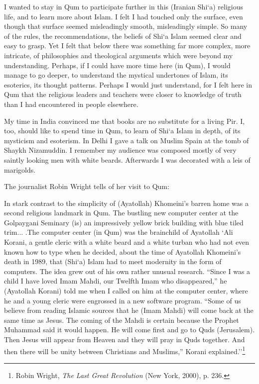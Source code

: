\begin{quotex}
I wanted to stay in Qum to participate further in this (Iranian Shi`a) religious life, and to learn more about Islam. I felt I had touched only the surface, even though that surface seemed misleadingly smooth, misleadingly simple. So many of the rules, the recommendations, the beliefs of Shi`a Islam seemed clear and easy to grasp. Yet I felt that below there was something far more complex, more intricate, of philosophies and theological arguments which were beyond my understanding. Perhaps, if I could have more time here (in Qum), I would manage to go deeper, to understand the mystical undertones of Islam, its esoterics, its thought patterns. Perhaps I would just understand, for I felt here in Qum that the religious leaders and teachers were closer to knowledge of truth than I had encountered in people elsewhere.
\end{quotex}


My time in India convinced me that books are no substitute for a living Pir. I, too, should like to spend time in Qum, to learn of Shi`a Islam in depth, of its mysticism and esoterism. In Delhi I gave a talk on Muslim Spain at the tomb of Shaykh Nizamuddin. I remember my audience was composed mostly of very saintly looking men with white beards. Afterwards I was decorated with a leis of marigolds.

The journalist Robin Wright tells of her visit to Qum:

In stark contrast to the simplicity of (Ayatollah) Khomeini's barren home was a second religious landmark in Qum. The bustling new computer center at the Golpaygani Seminary (is) an impressively yellow brick building with blue tiled trim... .The computer center (in Qum) was the brainchild of Ayatollah `Ali Korani, a gentle cleric with a white beard and a white turban who had not even known how to type when he decided, about the time of Ayatollah Khomeini's death in 1989, that (Shi`a) Islam had to meet modernity in the form of computers. The idea grew out of his own rather unusual research. ``Since I was a child I have loved Imam Mahdi, our Twelfth Imam who disappeared,'' he (Ayatollah Korani) told me when I called on him at the computer center, where he and a young cleric were engrossed in a new software program. ``Some of us believe from reading Islamic sources that he (Imam Mahdi) will come back at the same time as Jesus. The coming of the Mahdi is certain because the Prophet Muhammad said it would happen. He will come first and go to Quds (Jerusalem). Then Jesus will appear from Heaven and they will pray in Quds together. And then there will be unity between Christians and Muslims,'' Korani explained.''\footnote{Robin Wright, \emph{The Last Great Revolution} (New York, 2000), p. 236.}

